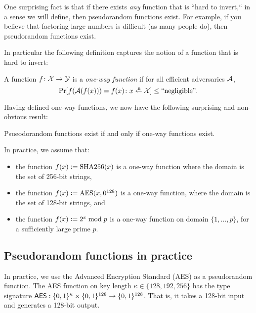 One surprising fact is that if there exists \emph{any} function that
is ``hard to invert,`` in a sense we will define, then pseudorandom
functions exist.
For example, if you believe that factoring large numbers is difficult
(as many people do), then pseudorandom functions exist.

In particular the following definition captures the notion of a
function that is hard to invert:
\begin{definition}\label{def:owf}
A function $f \colon \mathcal{X} \to \mathcal{Y}$ is a \emph{one-way function} if
for all efficient adversaries $\mathcal{A}$, 
\[ \Pr[f(\calA(f(x))) = f(x) \colon x \getsr \calX ] \leq \text{``negligible''}.\]
\end{definition}

Having defined one-way functions, we now have the following surprising and
non-obvious result:
\begin{theorem}
Psueodorandom functions exist if and only if one-way functions exist.
\end{theorem}

In practice, we assume that:
\begin{itemize}
  \item the function $f(x) \mathrel{\mathop:}= \text{SHA256}(x)$ is a one-way function
    where the domain is the set of 256-bit strings,
  \item the function $f(x) \mathrel{\mathop:}= \text{AES}(x, 0^{128})$ is a one-way function,
    where the domain is the set of 128-bit strings, and
  \item the function $f(x) \mathrel{\mathop:}= 2^x \bmod p$ is a one-way function
    on domain $\{1, \dots, p\}$, for a sufficiently large prime $p$.
\end{itemize}

\subsection{Pseudorandom functions in practice}

In practice, we use the Advanced Encryption
Standard (AES) as a pseudorandom function.
The AES function on key length $\kappa \in \{128, 192, 256\}$
has the type signature
$\mathsf{AES}: \{0,1\}^\kappa \times \{0,1\}^{128} \rightarrow \{0,1\}^{128}$.
That is, it takes a 128-bit input and generates a 128-bit output.

